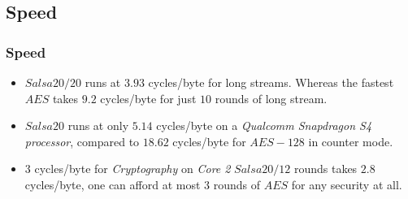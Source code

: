 \subsection{Speed}
\begin{frame}
\frametitle{Speed}

\begin{block}{}
\begin{itemize}
    \item $Salsa20/20$ runs at $3.93$ cycles/byte for long streams. Whereas the fastest $AES$ takes $9.2$ cycles/byte for just $10$ rounds of long stream. 
    \item  $Salsa20$ runs at only $5.14$ cycles/byte on a \textit{Qualcomm Snapdragon S4 processor}, compared to $18.62$ cycles/byte for $AES-128$ in counter mode.
    \item $3$ cycles/byte for \textit{Cryptography} on \textit{Core 2} $Salsa20/12$ rounds takes $2.8$ cycles/byte, one can afford at most $3$ rounds of $AES$ for any security at all.
\end{itemize}    
\end{block}

\end{frame}